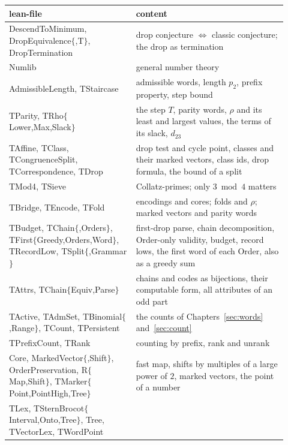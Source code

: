 \documentclass[10pt,a4paper,titlepage]{article}
\newcommand{\lean}[1]{\textsf{#1}}
\begin{document}
\begin{table}[p]
\centering
\footnotesize
\begin{tabular}{@{}>{\raggedright\arraybackslash}p{0.42\linewidth}>{\raggedright\arraybackslash}p{0.5\linewidth}@{}}
\toprule
lean-file & content \\
\midrule
\lean{DescendToMinimum}, \lean{DropEquivalence$\{$,T$\}$}, \lean{DropTermination}
  & drop conjecture $\iff$ classic conjecture; the drop as termination \\
\lean{Numlib}
  & general number theory \\
\lean{AdmissibleLength}, \lean{TStaircase}
  & admissible words, length $p_2$, prefix property, step bound \\
\lean{TParity}, \lean{TRho$\{$Lower,Max,Slack$\}$}
  & the step $T$, parity words, $\rho$ and its least and largest values, the terms of its slack, $d_{23}$ \\
\lean{TAffine}, \lean{TClass}, \lean{TCongruenceSplit}, \lean{TCorrespondence}, \lean{TDrop}
  & drop test and cycle point, classes and their marked vectors, class ids, drop formula, the bound of a split \\
\lean{TMod4}, \lean{TSieve}
  & Collatz-primes; only $3 \bmod 4$ matters \\
\lean{TBridge}, \lean{TEncode}, \lean{TFold}
  & encodings and cores; folds and $\rho$; marked vectors and parity words \\
\lean{TBudget}, \lean{TChain$\{$,Orders$\}$}, \lean{TFirst$\{$Greedy,Orders,Word$\}$}, \lean{TRecordLow}, \lean{TSplit$\{$,Grammar$\}$}
  & first-drop parse, chain decomposition, Order-only validity, budget, record lows, the first word of each Order, also as a greedy sum \\
\lean{TAttrs}, \lean{TChain$\{$Equiv,Parse$\}$}
  & chains and codes as bijections, their computable form, all attributes of an odd part \\
\lean{TActive}, \lean{TAdmSet}, \lean{TBinomial$\{$,Range$\}$}, \lean{TCount}, \lean{TPersistent}
  & the counts of Chapters~\ref{sec:words} and~\ref{sec:count} \\
\lean{TPrefixCount}, \lean{TRank}
  & counting by prefix, rank and unrank \\
\lean{Core}, \lean{MarkedVector$\{$,Shift$\}$}, \lean{OrderPreservation}, \lean{R$\{$Map,Shift$\}$}, \lean{TMarker$\{$Point,PointHigh,Tree$\}$}
  & fast map, shifts by multiples of a large power of $2$, marked vectors, the point of a number \\
\lean{TLex}, \lean{TSternBrocot$\{$Interval,Onto,Tree$\}$}, \lean{Tree}, \lean{TVectorLex}, \lean{TWordPoint}

\end{tabular}
\end{table}
\end{document}
